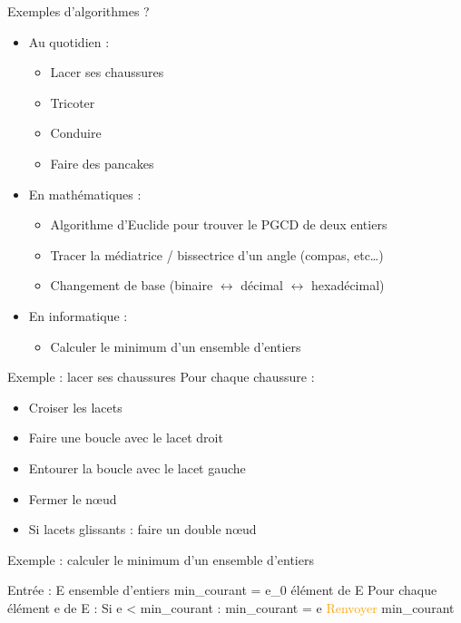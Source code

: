 \documentclass{beamer}
\begin{document}
\begin{frame}{Exemples d'algorithmes ?}
\begin{itemize}
\item Au quotidien :
  \begin{itemize}
  \item Lacer ses chaussures
  \item Tricoter
  \item Conduire
  \item Faire des pancakes
  \end{itemize}
\item En mathématiques :
  \begin{itemize}
  \item Algorithme d'Euclide pour trouver le PGCD de deux entiers
  \item Tracer la médiatrice / bissectrice d'un angle (compas, etc\dots)
  \item Changement de base (binaire $\leftrightarrow$ décimal $\leftrightarrow$ hexadécimal)
  \end{itemize}
\item En informatique :
  \begin{itemize}
  \item Calculer le minimum d'un ensemble d'entiers
  \end{itemize}
\end{itemize}
\end{frame}

\begin{frame}{Exemple : lacer ses chaussures}
Pour chaque chaussure :
\begin{itemize}
\item Croiser les lacets
\item Faire une boucle avec le lacet droit
\item Entourer la boucle avec le lacet gauche
\item Fermer le n\oe ud
\item Si lacets glissants : faire un double n\oe ud
\end{itemize}
\end{frame}

\begin{frame}[fragile]{Exemple : calculer le minimum d'un ensemble d'entiers}
\begin{semiverbatim}
Entrée : E ensemble d'entiers
min_courant = e_0 élément de E
Pour chaque élément e de E :
    Si e < min_courant :
        min_courant = e
\textcolor{orange}{Renvoyer} min_courant
\end{semiverbatim}
\end{frame}
\end{document}
